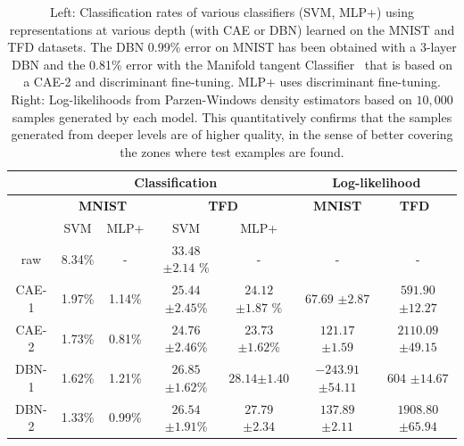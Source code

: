 \begin{table}[!htbp]
\begin{small}
 \begin{center}
\begin{tabular}{c|c|c||c|c||c|c|}
& \multicolumn{4}{|c||}{\bf Classification} & \multicolumn{2}{|c|}{\bf Log-likelihood}  \\ \hline
& \multicolumn{2}{|c||}{\bf MNIST} & \multicolumn{2}{c||}{\bf TFD} & \multicolumn{1}{|c|}{\bf MNIST} & \multicolumn{1}{c|}{\bf $\,\,\,$TFD $\,\,\,\,$}\\
& SVM &  MLP+ & SVM  & MLP+ & & \\ \hline
raw   & 8.34\%  & -      & $33.48$ {\scriptsize $\pm 2.14$ }\% & - & - & - \\ \hline
CAE-1 & 1.97\%  & 1.14\% & $25.44$ {\scriptsize $ \pm2.45$}\% & $24.12$ {\scriptsize $\pm1.87$} \% & $ 67.69$ {\scriptsize $\pm2.87$} & $591.90$ {\scriptsize $\pm12.27$}\\
CAE-2 & 1.73\%  & 0.81\% & $24.76$ {\scriptsize $\pm2.46$}\% & $23.73$ {\scriptsize $\pm1.62$}\% & $121.17$ {\scriptsize $\pm1.59$} & $2110.09$ {\scriptsize $\pm49.15$}\\ \hline
DBN-1 & 1.62\%  & 1.21\% & $26.85$ {\scriptsize $\pm1.62$}\% & $28.14${\scriptsize $\pm1.40 $}  & $-243.91$ {\scriptsize $\pm54.11$} &  $604$ {\scriptsize $\pm14.67$} \\
DBN-2 & 1.33\%  & 0.99\% & $26.54$ {\scriptsize $\pm1.91$}\% & $27.79$ {\scriptsize $\pm2.34$}& $137.89$ {\scriptsize $\pm2.11$} & $1908.80$ {\scriptsize $\pm65.94$}\\\hline
\end{tabular}

\caption{Left: Classification rates of various classifiers (SVM, MLP+)
  using representations at various depth (with CAE or DBN)
  learned on the MNIST and TFD datasets.  The DBN 0.99\% error on
  MNIST has been obtained with a 3-layer DBN and the 0.81\% error
  with the Manifold tangent
  Classifier~\citep{Dauphin-et-al-NIPS2011} that is based on a
  CAE-2 and discriminant fine-tuning. MLP+ uses discriminant
  fine-tuning. Right: Log-likelihoods from Parzen-Windows density
  estimators based on $10,000$ samples generated by each model. This
  quantitatively confirms that the samples generated from deeper
  levels are of higher quality, in the sense of better covering the
  zones where test examples are found.}
\label{tab:res-knn-svm}

\end{center}
\end{small}
\end{table}

